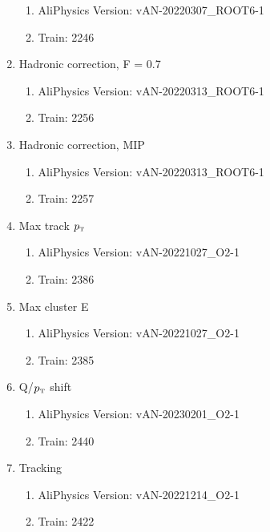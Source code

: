\documentclass[ALICE]{ALICE_analysis_notes}
\newcommand{\pT}{$p_{\mbox{\tiny T}}$\xspace}
\begin{document}
\begin{appendix}
\begin{enumerate}
\begin{enumerate}
        \item AliPhysics Version: vAN-20220307\_ROOT6-1
        \item Train: 2246
    \end{enumerate}
    \item Hadronic correction, F = 0.7
    \begin{enumerate}
        \item AliPhysics Version: vAN-20220313\_ROOT6-1
        \item Train: 2256
    \end{enumerate}
    \item Hadronic correction, MIP
    \begin{enumerate}
        \item AliPhysics Version: vAN-20220313\_ROOT6-1
        \item Train: 2257
    \end{enumerate}
    \item Max track \pT
    \begin{enumerate}
        \item AliPhysics Version: vAN-20221027\_O2-1
        \item Train: 2386
    \end{enumerate}
    \item Max cluster E
    \begin{enumerate}
        \item AliPhysics Version: vAN-20221027\_O2-1
        \item Train: 2385
    \end{enumerate}
    \item Q/\pT shift
    \begin{enumerate}
        \item AliPhysics Version: vAN-20230201\_O2-1
        \item Train: 2440
    \end{enumerate}
    \item Tracking
    \begin{enumerate}
        \item AliPhysics Version: vAN-20221214\_O2-1
        \item Train: 2422
    \end{enumerate}
\end{enumerate}


\end{appendix}
\end{document}
